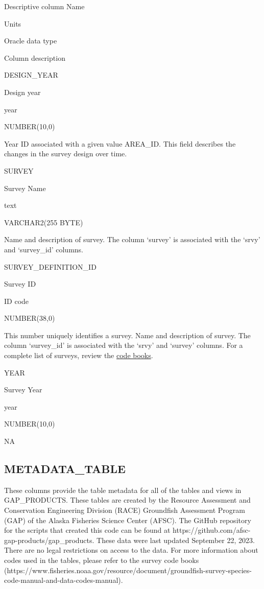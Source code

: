 \documentclass[
  letterpaper,
  oneside,
  open=any]{scrbook}
\begin{document}
Descriptive column Name

Units

Oracle data type

Column description

DESIGN\_YEAR

Design year

year

NUMBER(10,0)

Year ID associated with a given value AREA\_ID. This field describes the
changes in the survey design over time.

SURVEY

Survey Name

text

VARCHAR2(255 BYTE)

Name and description of survey. The column `survey' is associated with
the `srvy' and `survey\_id' columns.

SURVEY\_DEFINITION\_ID

Survey ID

ID code

NUMBER(38,0)

This number uniquely identifies a survey. Name and description of
survey. The column `survey\_id' is associated with the `srvy' and
`survey' columns. For a complete list of surveys, review the
\href{https://www.fisheries.noaa.gov/resource/document/groundfish-survey-species-code-manual-and-data-codes-manual}{code
books}.

YEAR

Survey Year

year

NUMBER(10,0)

NA

\hypertarget{metadata_table}{%
\subsection{METADATA\_TABLE}\label{metadata_table}}

These columns provide the table metadata for all of the tables and views
in GAP\_PRODUCTS. These tables are created by the Resource Assessment
and Conservation Engineering Division (RACE) Groundfish Assessment
Program (GAP) of the Alaska Fisheries Science Center (AFSC). The GitHub
repository for the scripts that created this code can be found at
https://github.com/afsc-gap-products/gap\_products. These data were last
updated September 22, 2023. There are no legal restrictions on access to
the data. For more information about codes used in the tables, please
refer to the survey code books
(https://www.fisheries.noaa.gov/resource/document/groundfish-survey-species-code-manual-and-data-codes-manual).
\end{document}
